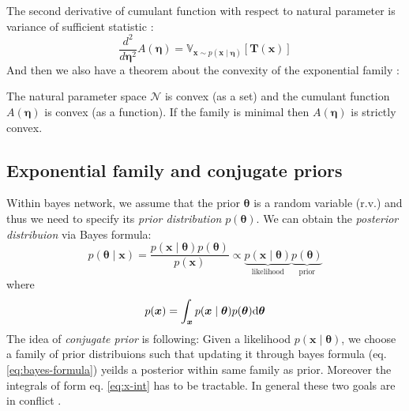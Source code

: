 The second derivative of cumulant function with respect to natural parameter is variance of sufficient statistic \cite{exp-family-jorden-2009}:
$$
\frac{d^2}{d \boldsymbol{\eta}^2} A(\boldsymbol{\eta}) = \mathbb{V}_{\boldsymbol{x} \sim p(\boldsymbol{x}\mid \boldsymbol{\eta})} [\boldsymbol{T}(\boldsymbol{x})]
$$
And then we also have a theorem about the convexity of the exponential family \cite{exp-family-jorden-2009}:
\begin{theorem}
The natural parameter space $\mathcal{N}$ is convex (as a set) and the cumulant function $A(\boldsymbol{\eta})$ is convex (as a function). 
If the family is minimal then $A(\boldsymbol{\eta})$ is strictly convex.
\end{theorem}
\subsection{Exponential family and conjugate priors}
Within bayes network, we assume that the prior $\boldsymbol{\theta}$ is a random variable (r.v.) and thus we need to specify its \textit{prior distribution} $p(\boldsymbol{\theta})$.
We can obtain the \textit{posterior distribuion} via Bayes formula:
\begin{equation}
    p(\boldsymbol{\theta} \mid \boldsymbol{x}) = \frac{p( \boldsymbol{x} \mid \boldsymbol{\theta}) p(\boldsymbol{\theta})}{p(\boldsymbol{x})} \propto \underbrace{p( \boldsymbol{x} \mid \boldsymbol{\theta})}_{\text{likelihood}} \underbrace{p(\boldsymbol{\theta})}_{\text{prior}}
    \label{eq:bayes-formula}
\end{equation}
where 
\begin{equation}
    p(\boldsymbol{x}) = \int_{\boldsymbol{x}} p( \boldsymbol{x} \mid \boldsymbol{\theta}) p(\boldsymbol{\theta}) \mbox{\rm d}\boldsymbol{\theta} \label{eq:x-int}
\end{equation}
The idea of  \textit{conjugate prior} is following: Given a likelihood $p( \boldsymbol{x} \mid \boldsymbol{\theta})$, we choose a family of prior distribuions such that updating it through 
bayes formula (eq. \ref{eq:bayes-formula}) yeilds a posterior within same family as prior. Moreover the integrals of form eq. \ref{eq:x-int} has to be tractable. In general these two goals
are in conflict \cite{conjugates-jorden-2009}. 

